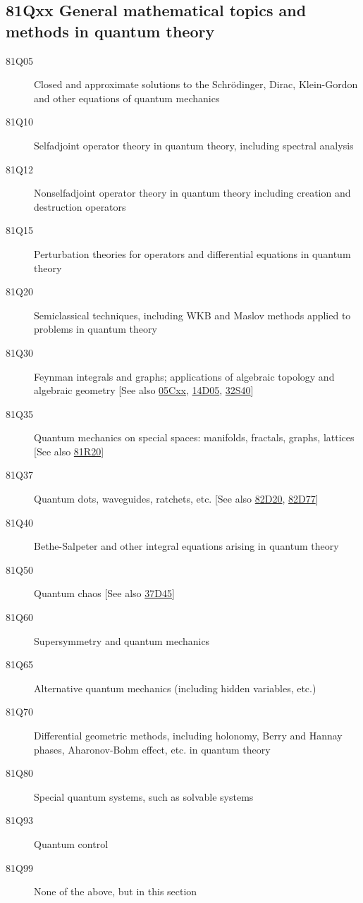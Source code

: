 \subsection*{81Qxx  General mathematical topics and methods in quantum theory }\label{81Qxx}
\begin{description}  
\item [81Q05]\label{81Q05} Closed and approximate solutions to the Schr\"{o}dinger, Dirac, Klein-Gordon and other equations of quantum mechanics
\item [81Q10]\label{81Q10} Selfadjoint operator theory in quantum theory, including spectral analysis
\item [81Q12]\label{81Q12} Nonselfadjoint operator theory in quantum theory including creation and destruction operators
\item [81Q15]\label{81Q15} Perturbation theories for operators and differential equations in quantum theory
\item [81Q20]\label{81Q20} Semiclassical techniques, including WKB and Maslov methods applied to problems in quantum theory
\item [81Q30]\label{81Q30} Feynman integrals and graphs; applications of algebraic topology and algebraic geometry [See also \hyperref[05Cxx]{05Cxx}, \hyperref[14D05]{14D05}, \hyperref[32S40]{32S40}]
\item [81Q35]\label{81Q35} Quantum mechanics on special spaces: manifolds, fractals, graphs, lattices [See also \hyperref[81R20]{81R20}]
\item [81Q37]\label{81Q37} Quantum dots, waveguides, ratchets, etc. [See also \hyperref[82D20]{82D20}, \hyperref[82D77]{82D77}]
\item [81Q40]\label{81Q40} Bethe-Salpeter and other integral equations arising in quantum theory
\item [81Q50]\label{81Q50} Quantum chaos [See also \hyperref[37D45]{37D45}]
\item [81Q60]\label{81Q60} Supersymmetry and quantum mechanics
\item [81Q65]\label{81Q65} Alternative quantum mechanics (including hidden variables, etc.)
\item [81Q70]\label{81Q70} Differential geometric methods, including holonomy, Berry and Hannay phases, Aharonov-Bohm effect, etc. in quantum theory
\item [81Q80]\label{81Q80} Special quantum systems, such as solvable systems
\item [81Q93]\label{81Q93} Quantum control
\item [81Q99]\label{81Q99} None of the above, but in this section
\end{description}
